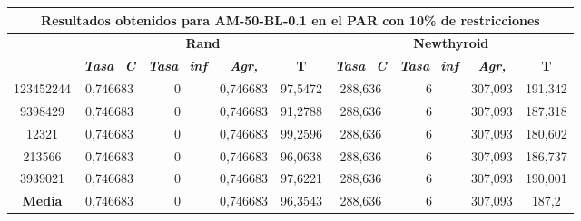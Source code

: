\documentclass[12pt, spanish]{article}
\begin{document}
\begin{table}[H]
\footnotesize
\begin{tabular}{|c|c|c|c|c|c|c|c|c|}
\hline
\multicolumn{9}{|c|}{\textbf{Resultados obtenidos para AM-50-BL-0.1 en el PAR con 10\% de restricciones}}                                                                                                         \\ \hline
\multirow{2}{*}{} & \multicolumn{4}{c|}{\textbf{Rand}}                                                            & \multicolumn{4}{c|}{\textbf{Newthyroid}}                                                      \\ \cline{2-9} 
                  & \textit{\textbf{Tasa\_C}} & \textit{\textbf{Tasa\_inf}} & \textit{\textbf{Agr,}} & \textbf{T} & \textit{\textbf{Tasa\_C}} & \textit{\textbf{Tasa\_inf}} & \textit{\textbf{Agr,}} & \textbf{T} \\ \hline
123452244         & 0,746683                  & 0                           & 0,746683               & 97,5472    & 288,636                   & 6                           & 307,093                & 191,342    \\ \hline
9398429           & 0,746683                  & 0                           & 0,746683               & 91,2788    & 288,636                   & 6                           & 307,093                & 187,318    \\ \hline
12321             & 0,746683                  & 0                           & 0,746683               & 99,2596    & 288,636                   & 6                           & 307,093                & 180,602    \\ \hline
213566            & 0,746683                  & 0                           & 0,746683               & 96,0638    & 288,636                   & 6                           & 307,093                & 186,737    \\ \hline
3939021           & 0,746683                  & 0                           & 0,746683               & 97,6221    & 288,636                   & 6                           & 307,093                & 190,001    \\ \hline
\textbf{Media}    & 0,746683                  & 0                           & 0,746683               & 96,3543    & 288,636                   & 6                           & 307,093                & 187,2      \\ \hline
\end{tabular}
\end{table}
\end{document}
